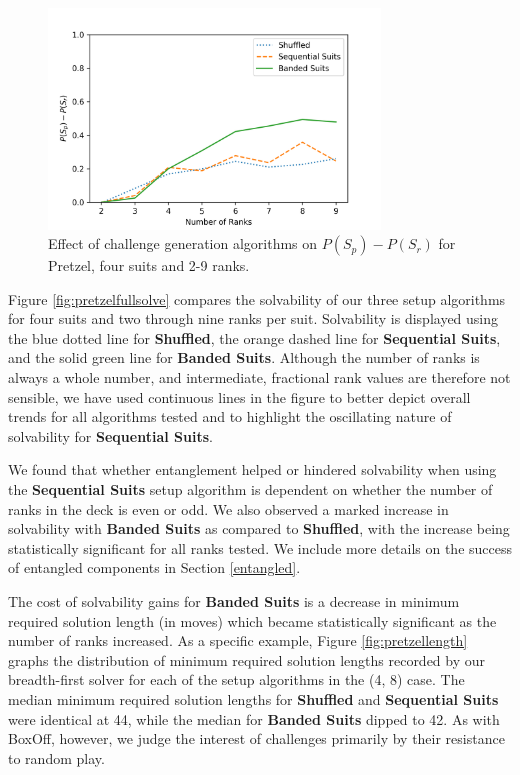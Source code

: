 \documentclass[journal]{IEEEtran}
\begin{document}
\begin{figure}[t]
\includegraphics[width=8.8cm]{figure11.png}
\caption{Effect of challenge generation algorithms on $P(S_p) - P(S_r)$ for Pretzel, four suits and 2-9 ranks.}
\label{fig:pretzelinterest}
\end{figure}

Figure \ref{fig:pretzelfullsolve} compares the solvability of our three setup algorithms for four suits and two through nine ranks per suit. Solvability is displayed using the blue dotted line for \textbf{Shuffled}, the orange dashed line for \textbf{Sequential Suits}, and the solid green line for \textbf{Banded Suits}. Although the number of ranks is always a whole number, and intermediate, fractional rank values are therefore not sensible, we have used continuous lines in the figure to better depict overall trends for all algorithms tested and to highlight the oscillating nature of solvability for \textbf{Sequential Suits}.

We found that whether entanglement helped or hindered solvability when using the \textbf{Sequential Suits} setup algorithm is dependent on whether the number of ranks in the deck is even or odd. We also observed a marked increase in solvability with \textbf{Banded Suits} as compared to \textbf{Shuffled}, with the increase being statistically significant for all ranks tested. We include more details on the success of entangled components in Section \ref{entangled}.

The cost of solvability gains for \textbf{Banded Suits} is a decrease in minimum required solution length (in moves) which became statistically significant as the number of ranks increased. As a specific example, Figure \ref{fig:pretzellength} graphs the distribution of minimum required solution lengths recorded by our breadth-first solver for each of the setup algorithms in the (4, 8) case. The median minimum required solution lengths for \textbf{Shuffled} and \textbf{Sequential Suits} were identical at 44, while the median for \textbf{Banded Suits} dipped to 42. As with BoxOff, however, we judge the interest of challenges primarily by their resistance to random play.
\end{document}
